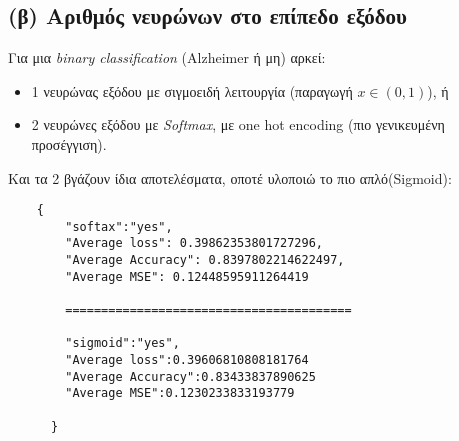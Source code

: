 \documentclass[a4paper,11pt]{article}
\begin{document}
\subsection{(β) Αριθμός νευρώνων στο επίπεδο εξόδου}
Για μια \emph{binary classification} (Alzheimer ή μη) αρκεί:
\begin{itemize}
    \item 1 νευρώνας εξόδου με σιγμοειδή λειτουργία (παραγωγή $x \in (0,1)$), ή
    \item 2 νευρώνες εξόδου με \emph{Softmax}, με one hot encoding (πιο γενικευμένη προσέγγιση).
\end{itemize}
Και τα 2 βγάζουν ίδια αποτελέσματα, οποτέ υλοποιώ το πιο απλό(Sigmoid):
\begin{verbatim}
    {
        "softax":"yes",
        "Average loss": 0.39862353801727296,
        "Average Accuracy": 0.8397802214622497,
        "Average MSE": 0.12448595911264419

        ========================================
        
        "sigmoid":"yes",
        "Average loss":0.39606810808181764
        "Average Accuracy":0.83433837890625
        "Average MSE":0.1230233833193779

      }
    \end{verbatim}
\end{document}
